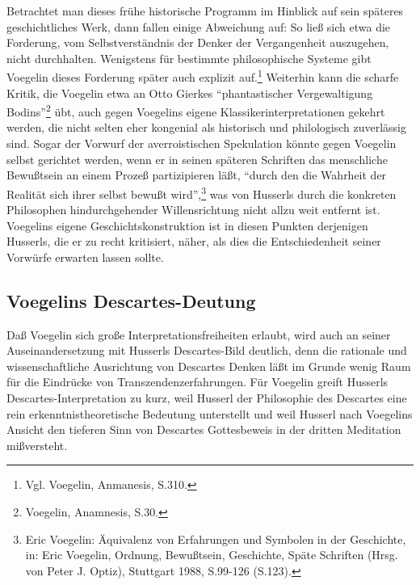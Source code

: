 Betrachtet man dieses frühe historische Programm im Hinblick auf sein späteres
geschichtliches Werk, dann fallen einige Abweichung auf: So ließ sich etwa die
Forderung, vom Selbstverständnis der Denker der Vergangenheit auszugehen,
nicht durchhalten. Wenigstens für bestimmte philosophische Systeme gibt
Voegelin dieses Forderung später auch explizit auf.\footnote{Vgl. Voegelin,
  Anmanesis, S.310.} Weiterhin kann die scharfe Kritik, die Voegelin etwa an
Otto Gierkes "`phantastischer Vergewaltigung Bodins"'\footnote{Voegelin,
  Anamnesis, S.30.} übt, auch gegen Voegelins eigene Klassikerinterpretationen
gekehrt werden, die nicht selten eher kongenial als historisch und
philologisch zuverlässig sind. Sogar der Vorwurf der averroistischen
Spekulation könnte gegen Voegelin selbst gerichtet werden, wenn er in seinen
späteren Schriften das menschliche Bewußtsein an einem Prozeß partizipieren
läßt, "`durch den die Wahrheit der Realität sich ihrer selbst bewußt
wird"',\footnote{Eric Voegelin: Äquivalenz von Erfahrungen und Symbolen in der
  Geschichte, in: Eric Voegelin, Ordnung, Bewußtsein, Geschichte, Späte
  Schriften (Hrsg. von Peter J. Optiz), Stuttgart 1988, S.99-126 (S.123).} was
von Husserls durch die konkreten Philosophen hindurchgehender
Willensrichtung nicht allzu weit entfernt ist. Voegelins eigene
Geschichtskonstruktion ist in diesen Punkten derjenigen Husserls, die er zu
recht kritisiert, näher, als dies die Entschiedenheit seiner Vorwürfe erwarten
lassen sollte.


\subsection{Voegelins Descartes-Deutung}

Daß Voegelin sich große Interpretationsfreiheiten erlaubt, wird auch an
seiner Auseinandersetzung mit Husserls Descartes-Bild deutlich, denn die
rationale und wissenschaftliche Ausrichtung von Descartes Denken läßt im
Grunde wenig Raum für die Eindrücke von Transzendenzerfahrungen. Für Voegelin
greift Husserls Descartes-Interpretation zu kurz, weil Husserl der Philosophie
des Descartes eine rein erkenntnistheoretische Bedeutung unterstellt und weil
Husserl nach Voegelins Ansicht den tieferen Sinn von Descartes Gottesbeweis in
der dritten Meditation mißversteht.

